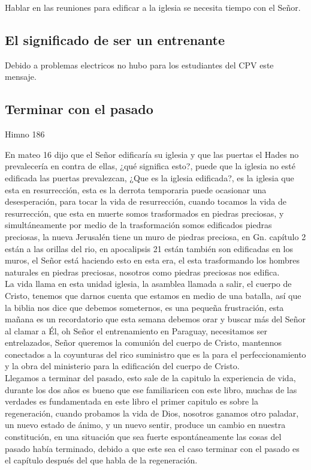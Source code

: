 \documentclass[12pt]{article}
\begin{document}
Hablar en las reuniones para edificar a la iglesia se necesita tiempo con el Señor.

\subsection*{El significado de ser un entrenante}

Debido a problemas electricos no hubo para los estudiantes del CPV este mensaje. 

\subsection*{Terminar con el pasado}

Himno 186

En mateo 16 dijo que el Señor edificaría su iglesia y que las puertas el Hades no prevalecería en contra de ellas, ¿qué significa esto?, puede que la iglesia no esté edificada las puertas prevalezcan, ¿Que es la iglesia edificada?, es la iglesia que esta en resurrección, esta es la derrota temporaria puede ocasionar una desesperación, para tocar la vida de resurrección, cuando tocamos la vida de resurrección, que esta en muerte somos trasformados en piedras preciosas, y simultáneamente por medio de la trasformación somos edificados piedras preciosas, la nueva Jerusalén tiene un muro de piedras preciosa, en Gn. capítulo 2 están a las orillas del rio, en apocalipsis 21 están también son edificadas en los muros, el Señor está haciendo esto en esta era, el esta trasformando los hombres naturales en piedras preciosas, nosotros como piedras preciosas nos edifica.\\

 La vida llama en esta unidad iglesia, la asamblea llamada a salir, el cuerpo de Cristo, tenemos que darnos cuenta que estamos en medio de una batalla, así que la biblia nos dice que debemos someternos, es una pequeña frustración, esta mañana es un recordatorio que esta semana debemos orar y buscar más del Señor al clamar a Él, oh Señor el entrenamiento en Paraguay, necesitamos ser  entrelazados, Señor queremos la comunión del cuerpo de Cristo, mantennos conectados a la coyunturas del rico suministro que es la para el perfeccionamiento y la obra del ministerio para la edificación del cuerpo de Cristo.\\

Llegamos a terminar del pasado, esto sale de  la capitulo la experiencia de vida, durante los dos años es bueno que ese familiaricen con este libro, muchas de las verdades es fundamentada en este libro el primer capitulo es sobre la regeneración, cuando probamos la vida de Dios, nosotros ganamos otro paladar, un nuevo estado de ánimo, y un nuevo sentir, produce un cambio en nuestra constitución, en una situación que sea fuerte espontáneamente las cosas del pasado había terminado, debido a que este sea el caso terminar con el pasado es el capítulo después del que habla de la regeneración.\\
\end{document}
